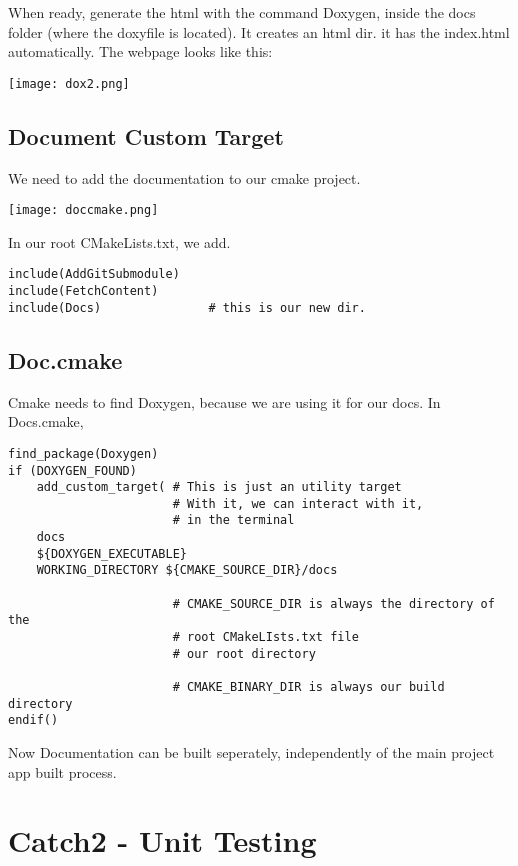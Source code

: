 When ready, generate the html with the command Doxygen, inside the docs folder (where the doxyfile is located). It creates an html dir.
it has the index.html automatically. The webpage looks like this:


\begin{center}
    \texttt{[image: dox2.png]}
\end{center}


\subsection{Document Custom Target}

We need to add the documentation to our cmake project.

\begin{center}
    \texttt{[image: doccmake.png]}
\end{center}

In our root CMakeLists.txt, we add.

\begin{verbatim}
include(AddGitSubmodule)
include(FetchContent)
include(Docs)               # this is our new dir.

\end{verbatim}


\subsection{Doc.cmake}

Cmake needs to find Doxygen, because we are using it for our docs. In Docs.cmake,

\begin{verbatim}
find_package(Doxygen)
if (DOXYGEN_FOUND)
    add_custom_target( # This is just an utility target
                       # With it, we can interact with it, 
                       # in the terminal
    docs
    ${DOXYGEN_EXECUTABLE}
    WORKING_DIRECTORY ${CMAKE_SOURCE_DIR}/docs

                       # CMAKE_SOURCE_DIR is always the directory of the
                       # root CMakeLIsts.txt file
                       # our root directory

                       # CMAKE_BINARY_DIR is always our build directory
endif()
\end{verbatim}

Now Documentation can be built seperately, independently of the main project app built process.

\section{Catch2 - Unit Testing}

